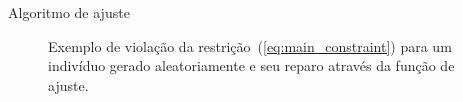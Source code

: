 \documentclass{beamer}
\begin{document}

\begin{frame}{Algoritmo de ajuste}
\begin{figure}[!htbp]
  \begin{center}
    \caption{Exemplo de violação da restrição~(\ref{eq:main_constraint}) para um indivíduo gerado aleatoriamente e seu reparo através da função de ajuste.}\label{fig:creation-ga}
\end{center}
\end{figure}
\end{frame}

%   
\end{document}
